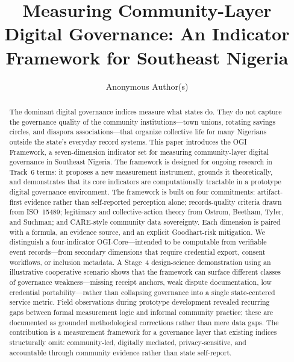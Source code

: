 \documentclass[sigconf,anonymous]{acmart}
\begin{document}
\title{Measuring Community-Layer Digital Governance: An Indicator Framework for Southeast Nigeria}

\author{Anonymous Author(s)}

\begin{abstract}
The dominant digital governance indices measure what states do. They do not capture the governance quality of the community institutions---town unions, rotating savings circles, and diaspora associations---that organize collective life for many Nigerians outside the state's everyday record systems. This paper introduces the OGI Framework, a seven-dimension indicator set for measuring community-layer digital governance in Southeast Nigeria. The framework is designed for ongoing research in Track~6 terms: it proposes a new measurement instrument, grounds it theoretically, and demonstrates that its core indicators are computationally tractable in a prototype digital governance environment. The framework is built on four commitments: artifact-first evidence rather than self-reported perception alone; records-quality criteria drawn from ISO~15489; legitimacy and collective-action theory from Ostrom, Beetham, Tyler, and Suchman; and CARE-style community data sovereignty. Each dimension is paired with a formula, an evidence source, and an explicit Goodhart-risk mitigation. We distinguish a four-indicator OGI-Core---intended to be computable from verifiable event records---from secondary dimensions that require credential export, consent workflows, or inclusion metadata. A Stage~4 design-science demonstration using an illustrative cooperative scenario shows that the framework can surface different classes of governance weakness---missing receipt anchors, weak dispute documentation, low credential portability---rather than collapsing governance into a single state-centered service metric. Field observations during prototype development revealed recurring gaps between formal measurement logic and informal community practice; these are documented as grounded methodological corrections rather than mere data gaps. The contribution is a measurement framework for a governance layer that existing indices structurally omit: community-led, digitally mediated, privacy-sensitive, and accountable through community evidence rather than state self-report.
\end{abstract}

\end{document}
